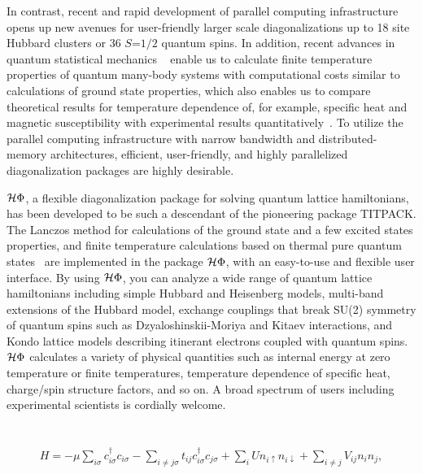 \documentclass[review]{elsarticle}
\begin{document}
In contrast, recent and rapid development of parallel computing infrastructure opens up new
avenues for user-friendly larger scale diagonalizations up to 18 site Hubbard clusters
or 36 $S$=$1/2$ quantum spins. In addition, recent advances in quantum statistical mechanics ~\cite{Imada1986,FTLanczos,Hams,Sugiura2012}
enable us to calculate finite temperature properties of quantum many-body systems
with computational costs similar to calculations of ground state properties,
which also enables us to compare theoretical results for temperature dependence
of, for example, specific heat and magnetic susceptibility with experimental results quantitatively~\cite{Yamaji2014}.
To utilize the parallel computing infrastructure with narrow bandwidth and distributed-memory
architectures, efficient, user-friendly, and highly parallelized diagonalization packages are highly desirable.

$\mathcal{H} \Phi$, a flexible diagonalization package for solving quantum lattice hamiltonians,
has been developed to be such a descendant of the pioneering package TITPACK.
The Lanczos method for calculations of the ground state and a few excited states properties,
and finite temperature calculations based on thermal pure quantum states~\cite{Sugiura2012} are implemented in
the package $\mathcal{H} \Phi$, with an easy-to-use and flexible user interface.
By using $\mathcal{H} \Phi$, you can analyze a wide range of quantum lattice hamiltonians including
simple Hubbard and Heisenberg models, multi-band extensions of the Hubbard model,
exchange couplings that break SU(2) symmetry of quantum spins such as Dzyaloshinskii-Moriya
and Kitaev interactions, and Kondo lattice models describing itinerant electrons coupled with
quantum spins. $\mathcal{H} \Phi$ calculates a variety of physical quantities such as internal energy at zero temperature or finite temperatures, temperature dependence of specific heat, charge/spin structure factors, and so on. A broad spectrum of users including experimental scientists is cordially welcome.

\section{}

\begin{eqnarray}
H = -\mu \sum_{i \sigma} c^\dagger_{i \sigma} c_{i \sigma} 
- \sum_{i \neq j \sigma} t_{i j} c^\dagger_{i \sigma} c_{j \sigma} 
+ \sum_{i} U n_{i \uparrow} n_{i \downarrow}
+ \sum_{i \neq j} V_{i j} n_{i} n_{j},
\end{eqnarray}
\end{document}
